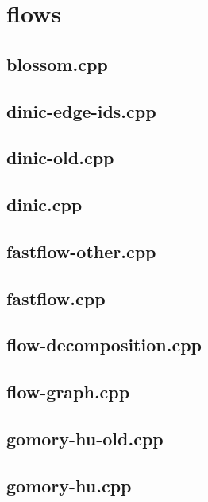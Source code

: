 \section{flows}

\subsection{blossom.cpp}


\subsection{dinic-edge-ids.cpp}


\subsection{dinic-old.cpp}


\subsection{dinic.cpp}


\subsection{fastflow-other.cpp}


\subsection{fastflow.cpp}


\subsection{flow-decomposition.cpp}


\subsection{flow-graph.cpp}


\subsection{gomory-hu-old.cpp}


\subsection{gomory-hu.cpp}


